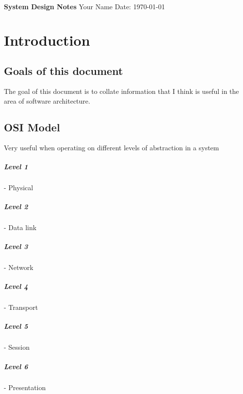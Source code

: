 \documentclass[a4paper, 11pt]{book}
\begin{document}
    \begin{titlepage}
        \centering
        \vspace*{2in}
        \Huge \textbf{System Design Notes}
        \vfill
        \Large Your Name
        \vfill
        \Large Date: \today
    \end{titlepage}

    \newpage

    \tableofcontents
    \newpage


    \chapter{Introduction}


    \section{Goals of this document}
    The goal of this document is to collate information that I think is useful in the area of software architecture.


    \section{OSI Model}
    Very useful when operating on different levels of abstraction in a system

    \paragraph{Level 1} - Physical

    \paragraph{Level 2} - Data link

    \paragraph{Level 3} - Network

    \paragraph{Level 4} - Transport

    \paragraph{Level 5} - Session

    \paragraph{Level 6} - Presentation
\end{document}
